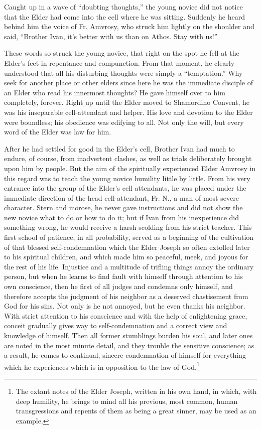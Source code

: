 Caught up in a wave of ``doubting thoughts,'' the young novice did not notice that the Elder had come into the cell where he was sitting. Suddenly he heard behind him the voice of Fr. Amvrosy, who struck him lightly on the shoulder and said, ``Brother Ivan, it's better with us than on Athos. Stay with us!''

These words so struck the young novice, that right on the spot he fell at the Elder's feet in repentance and compunction. From that moment, he clearly understood that all his disturbing thoughts were simply a ``temptation.'' Why seek for another place or other elders since here he was the immediate disciple of an Elder who read his innermost thoughts? He gave himself over to him completely, forever. Right up until the Elder moved to Shamordino Convent, he was his inseparable cell-attendant and helper. His love and devotion to the Elder were boundless; his obedience was edifying to all. Not only the will, but every word of the Elder was law for him.

After he had settled for good in the Elder's cell, Brother Ivan had much to endure, of course, from inadvertent clashes, as well as trials deliberately brought upon him by people. But the aim of the spiritually experienced Elder Amvrosy in this regard was to teach the young novice humility little by little. From his very entrance into the group of the Elder's cell attendants, he was placed under the immediate direction of the head cell-attendant, Fr. N., a man of most severe character. Stern and morose, he never gave instructions and did not show the new novice what to do or how to do it; but if Ivan from his inexperience did something wrong, he would receive a harsh scolding from his strict teacher. This first school of patience, in all probability, served as a beginning of the cultivation of that blessed self-condemnation which the Elder Joseph so often extolled later to his spiritual children, and which made him so peaceful, meek, and joyous for the rest of his life. Injustice and a multitude of trifling things annoy the ordinary person, but when he learns to find fault with himself through attention to his own conscience, then he first of all judges and condemns only himself, and therefore accepts the judgment of his neighbor as a deserved chastisement from God for his sins. Not only is he not annoyed, but he even thanks his neighbor. With strict attention to his conscience and with the help of enlightening grace, conceit gradually gives way to self-condemnation and a correct view and knowledge of himself. Then all former stumblings burden his soul, and later ones are noted in the most minute detail, and they trouble the sensitive conscience; as a result, he comes to continual, sincere condemnation of himself for everything which he experiences which is in opposition to the law of God.\footnote{The extant notes of the Elder Joseph, written in his own hand, in which, with deep humility, he brings to mind all his previous, most common, human transgressions and repents of them as being a great sinner, may be used as an example.}

